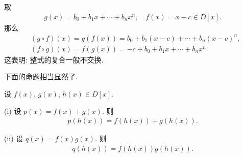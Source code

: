 \begin{example}
    取
    \begin{align*}
        g(x) = b_0 + b_1 x + \cdots + b_n x^n, \quad f(x) = x - c \in D[x].
    \end{align*}
    那么
    \begin{align*}
         & (g \circ f) (x) = g(f(x)) = b_0 + b_1 (x-c) + \cdots + b_n (x-c)^n, \\
         & (f \circ g) (x) = f(g(x)) = -c + b_0 + b_1 x + \cdots + b_n x^n.
    \end{align*}
    这表明: 整式的复合一般不交换.
\end{example}

下面的命题相当显然了.

\begin{proposition}
    设 $f(x)$, $g(x)$, $h(x) \in D[x]$.

    (i) 设 $p(x) = f(x) + g(x)$. 则
    \begin{align*}
        p(h(x)) = f(h(x)) + g(h(x)).
    \end{align*}

    (ii) 设 $q(x) = f(x) g(x)$. 则
    \begin{align*}
        q(h(x)) = f(h(x)) g(h(x)).
    \end{align*}
\end{proposition}

